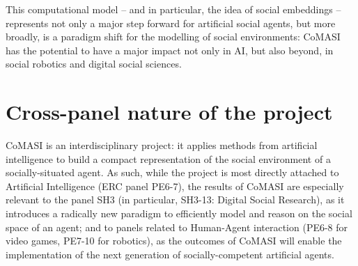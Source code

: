 \documentclass[11pt,a4paper]{report}
\newcommand{\project}{CoMASI\xspace}
\begin{document}

%
%
%

This computational model -- and in particular, the idea of social embeddings --
represents not only a major step forward for artificial social agents, but more
broadly, is a paradigm shift for the modelling of social environments: \project
has the potential to have a major impact not only in AI, but also beyond, in social
robotics and digital social sciences.



\section*{Cross-panel nature of the project}\label{panels}

\project is an interdisciplinary project: it applies methods from artificial
intelligence to build a compact representation of the social environment of a
socially-situated agent. As such, while the project is most directly attached to
Artificial Intelligence (ERC panel PE6-7), the results of \project are
especially relevant to the panel SH3 (in particular, SH3-13: Digital Social
Research), as it introduces a radically new paradigm to efficiently model and
reason on the social space of an agent; and to panels related to Human-Agent
interaction (PE6-8 for video games, PE7-10 for robotics), as the outcomes
of \project will enable the implementation of the next generation of
socially-competent artificial agents.
\end{document}
